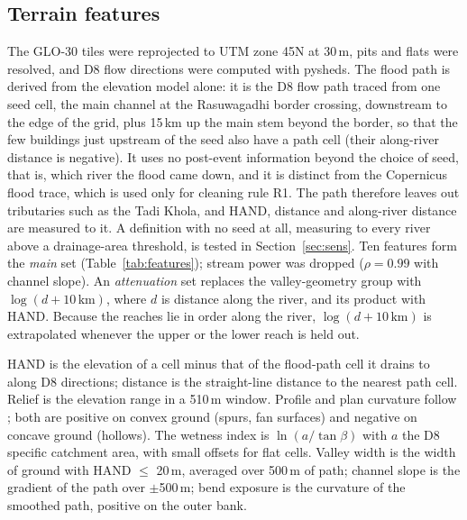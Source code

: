 \documentclass[journal,a4paper]{IEEEtran}
\begin{document}
\subsection{Terrain features}
The GLO-30 tiles were reprojected to UTM zone 45N at 30\,m, pits and flats were resolved, and D8 flow directions were computed with pysheds. The flood path is derived from the elevation model alone: it is the D8 flow path traced from one seed cell, the main channel at the Rasuwagadhi border crossing, downstream to the edge of the grid, plus 15\,km up the main stem beyond the border, so that the few buildings just upstream of the seed also have a path cell (their along-river distance is negative). It uses no post-event information beyond the choice of seed, that is, which river the flood came down, and it is distinct from the Copernicus flood trace, which is used only for cleaning rule R1. The path therefore leaves out tributaries such as the Tadi Khola, and HAND, distance and along-river distance are measured to it. A definition with no seed at all, measuring to every river above a drainage-area threshold, is tested in Section~\ref{sec:sens}. Ten features form the \emph{main} set (Table~\ref{tab:features}); stream power was dropped ($\rho = 0.99$ with channel slope). An \emph{attenuation} set replaces the valley-geometry group with $\log(d + 10\,\mathrm{km})$, where $d$ is distance along the river, and its product with HAND. Because the reaches lie in order along the river, $\log(d + 10\,\mathrm{km})$ is extrapolated whenever the upper or the lower reach is held out.

HAND is the elevation of a cell minus that of the flood-path cell it drains to along D8 directions; distance is the straight-line distance to the nearest path cell. Relief is the elevation range in a 510\,m window. Profile and plan curvature follow \citet{zevenbergen1987}; both are positive on convex ground (spurs, fan surfaces) and negative on concave ground (hollows). The wetness index is $\ln(a/\tan\beta)$ with $a$ the D8 specific catchment area, with small offsets for flat cells. Valley width is the width of ground with HAND $\leq$ 20\,m, averaged over 500\,m of path; channel slope is the gradient of the path over $\pm$500\,m; bend exposure is the curvature of the smoothed path, positive on the outer bank.
\end{document}
